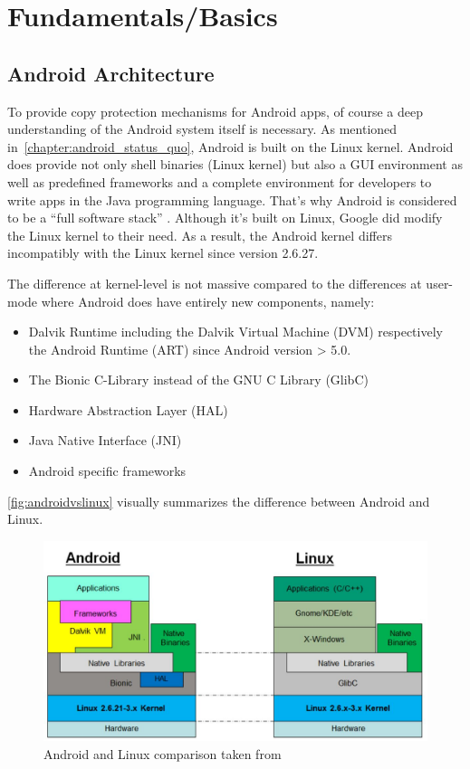 \chapter{Fundamentals/Basics}\label{chapter:android_basics}

\section{Android Architecture}\label{section:android_architecture}
To provide copy protection mechanisms for Android apps,
of course a deep understanding of the Android system itself
is necessary. As mentioned in~\autoref{chapter:android_status_quo},
Android is built on the Linux kernel. Android does provide not
only shell binaries (Linux kernel) but also a GUI environment
as well as predefined frameworks and a complete environment
for developers to write apps in the Java programming language.
That's why Android is considered to be a ``full software stack''
\parencite[p.7f]{levin}. Although it's built on Linux,
Google did modify the Linux kernel to their need.
As a result, the Android kernel differs
incompatibly with the Linux kernel since version 2.6.27.

The difference at kernel-level is not massive compared to
the differences at user-mode where Android does have entirely new
components, namely:

\begin{itemize}
\item Dalvik Runtime including the Dalvik Virtual Machine (DVM)
respectively the Android Runtime (ART) since Android version > 5.0.
\item The Bionic C-Library instead of the GNU C Library (GlibC)
\item Hardware Abstraction Layer (HAL)
\item Java Native Interface (JNI)
\item Android specific frameworks
\end{itemize}

\autoref{fig:androidvslinux} visually summarizes the difference
between Android and Linux.

\begin{figure}[htb]
  \includegraphics[width=\textwidth]{figures/androidvslinux}
  \caption[Android vs Linux]{Android and Linux comparison taken from
  ~\parencite[p.9]{levin}}
  \label{fig:androidvslinux}
\end{figure}

